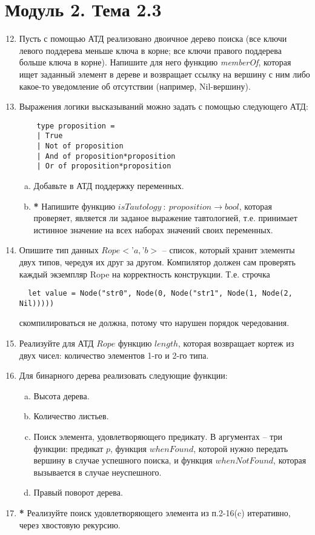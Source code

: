 \documentclass[a4paper,11pt]{article}
\begin{document}
\section*{Модуль 2. Тема 2.3}
\begin{enumerate}[{2-}1]
  \setcounter{enumi}{11}

\item Пусть с помощью АТД реализовано двоичное дерево поиска (все ключи левого
  поддерева меньше ключа в корне; все ключи правого поддерева больше ключа
  в корне). Напишите для него функцию \emph{memberOf}, которая ищет заданный
  элемент в дереве и возвращает ссылку на вершину с ним либо какое-то
  уведомление об отсутствии (например, Nil-вершину).
  
\item Выражения логики высказываний можно задать с помощью следующего АТД:
  \begin{lstlisting}
    type proposition =
    | True
    | Not of proposition
    | And of proposition*proposition
    | Or of proposition*proposition
  \end{lstlisting}
  \begin{enumerate}[(a)]
  \item Добавьте в АТД поддержку переменных.
  \item \textbf{*} Напишите функцию 
    $isTautology~:~proposition \rightarrow bool$, которая
    проверяет, является ли заданое выражение тавтологией, т.е. принимает
    истинное значение на всех наборах значений своих переменных.  
  \end{enumerate}

\item Опишите тип данных $Rope<’a, ’b>$ -- список, который хранит элементы 
двух типов, чередуя их друг за другом. Компилятор должен сам проверять каждый
экземпляр Rope на корректность конструкции. Т.е. строчка
\begin{lstlisting}
  let value = Node("str0", Node(0, Node("str1", Node(1, Node(2, Nil)))))
\end{lstlisting}
скомпилироваться не должна, потому что нарушен порядок чередования.

\item Реализуйте для АТД $Rope$ функцию $length$, которая возвращает кортеж
из двух чисел: количество элементов 1-го и 2-го типа.

\item Для бинарного дерева реализовать следующие функции:
  \begin{enumerate}[(a)]
  \item Высота дерева.
  \item Количество листьев.
  \item Поиск элемента, удовлетворяющего предикату. В аргументах – три 
    функции: предикат $p$, функция $whenFound$, которой нужно передать вершину
    в случае успешного поиска, и функция $whenNotFound$, которая вызывается в
    случае неуспешного.
  \item Правый поворот дерева.
  \end{enumerate}

\item \textbf{*} Реализуйте поиск удовлетворяющего элемента из п.2-16(c) 
  итеративно, через хвостовую рекурсию.
\end{enumerate}
\end{document}
